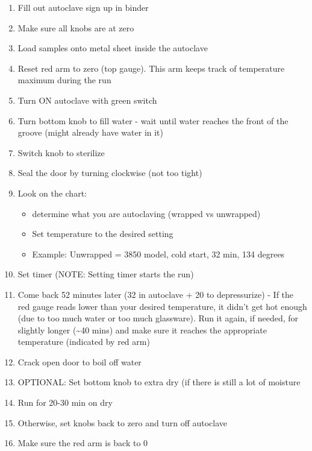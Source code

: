 \documentclass[
  letterpaper,
  DIV=11,
  numbers=noendperiod]{scrreprt}
\begin{document}

\begin{enumerate}
\def\labelenumi{\arabic{enumi}.}
\item
  Fill out autoclave sign up in binder
\item
  Make sure all knobs are at zero
\item
  Load samples onto metal sheet inside the autoclave
\item
  Reset red arm to zero (top gauge). This arm keeps track of temperature
  maximum during the run
\item
  Turn ON autoclave with green switch
\item
  Turn bottom knob to fill water - wait until water reaches the front of
  the groove (might already have water in it)
\item
  Switch knob to sterilize
\item
  Seal the door by turning clockwise (not too tight)
\item
  Look on the chart:

  \begin{itemize}
  \item
    determine what you are autoclaving (wrapped vs unwrapped)
  \item
    Set temperature to the desired setting
  \item
    Example: Unwrapped = 3850 model, cold start, 32 min, 134 degrees
  \end{itemize}
\item
  Set timer (NOTE: Setting timer starts the run)
\item
  Come back 52 minutes later (32 in autoclave + 20 to depressurize) - If
  the red gauge reads lower than your desired temperature, it didn't get
  hot enough (due to too much water or too much glassware). Run it
  again, if needed, for slightly longer (\textasciitilde40 mins) and
  make sure it reaches the appropriate temperature (indicated by red
  arm)
\item
  Crack open door to boil off water
\item
  OPTIONAL: Set bottom knob to extra dry (if there is still a lot of
  moisture
\item
  Run for 20-30 min on dry
\item
  Otherwise, set knobs back to zero and turn off autoclave
\item
  Make sure the red arm is back to 0\\
\end{enumerate}
\end{document}
